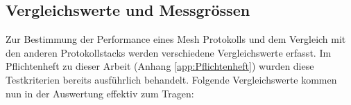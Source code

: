 %
%
%



\subsection{Vergleichswerte und Messgrössen}\label{subsec:VergleichswerteundMessgrössenMesh}

Zur Bestimmung der Performance eines Mesh Protokolls und dem Vergleich mit den anderen Protokollstacks werden verschiedene Vergleichswerte erfasst.
Im Pflichtenheft zu dieser Arbeit (Anhang \ref{app:Pflichtenheft}) wurden diese Testkriterien bereits ausführlich behandelt.
Folgende Vergleichswerte kommen nun in der Auswertung effektiv zum Tragen:

